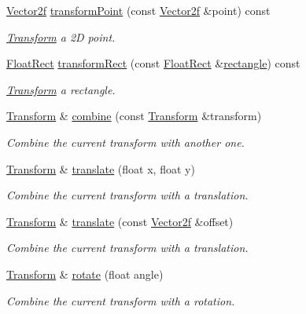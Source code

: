 \begin{DoxyCompactItemize}
\hyperlink{classsf_1_1_vector2}{Vector2f} \hyperlink{classsf_1_1_transform_ac322cd8f6d606598d1aacc4d1d160ad6}{transform\+Point} (const \hyperlink{classsf_1_1_vector2}{Vector2f} \&point) const 
\begin{DoxyCompactList}\small\item\em \hyperlink{classsf_1_1_transform}{Transform} a 2\+D point. \end{DoxyCompactList}\item 
\hyperlink{classsf_1_1_rect}{Float\+Rect} \hyperlink{classsf_1_1_transform_a345112559981d988e92b54b7976fca8a}{transform\+Rect} (const \hyperlink{classsf_1_1_rect}{Float\+Rect} \&\hyperlink{structrectangle}{rectangle}) const 
\begin{DoxyCompactList}\small\item\em \hyperlink{classsf_1_1_transform}{Transform} a rectangle. \end{DoxyCompactList}\item 
\hyperlink{classsf_1_1_transform}{Transform} \& \hyperlink{classsf_1_1_transform_acd978f60421a0f839bb9a8263e8877ff}{combine} (const \hyperlink{classsf_1_1_transform}{Transform} \&transform)
\begin{DoxyCompactList}\small\item\em Combine the current transform with another one. \end{DoxyCompactList}\item 
\hyperlink{classsf_1_1_transform}{Transform} \& \hyperlink{classsf_1_1_transform_ab54f6c8070cc05e2afcb3145fbf4395a}{translate} (float x, float y)
\begin{DoxyCompactList}\small\item\em Combine the current transform with a translation. \end{DoxyCompactList}\item 
\hyperlink{classsf_1_1_transform}{Transform} \& \hyperlink{classsf_1_1_transform_a452ff6e32d5120fa8c132c1bf0ad83cd}{translate} (const \hyperlink{classsf_1_1_vector2}{Vector2f} \&offset)
\begin{DoxyCompactList}\small\item\em Combine the current transform with a translation. \end{DoxyCompactList}\item 
\hyperlink{classsf_1_1_transform}{Transform} \& \hyperlink{classsf_1_1_transform_a3e548c3c9e3fb9d4bd43cf852669e555}{rotate} (float angle)
\begin{DoxyCompactList}\small\item\em Combine the current transform with a rotation. \end{DoxyCompactList}\item 

\end{DoxyCompactItemize}
